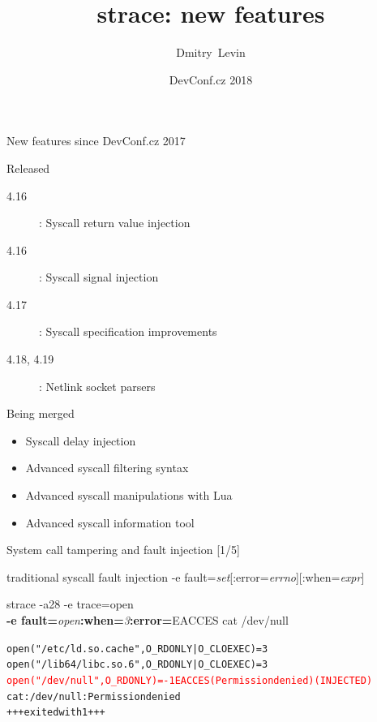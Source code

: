 \documentclass[unicode]{beamer}
\title{\Huge strace: new features}
\author{\Huge Dmitry~Levin}
\institute[BaseALT]{\Large BaseALT}
\date{DevConf.cz 2018}
\begin{document}
\begin{frame}
\titlepage
\end{frame}

\begin{frame}{New features since DevConf.cz 2017}
\begin{block}{\large Released}
\begin{description}
	\item[4.16]: Syscall return value injection
	\item[4.16]: Syscall signal injection
	\item[4.17]: Syscall specification improvements
	\item[4.18, 4.19]: Netlink socket parsers
\end{description}
\end{block}
\begin{block}{\large Being merged}
\begin{itemize}
	\item Syscall delay injection
	\item Advanced syscall filtering syntax
	\item Advanced syscall manipulations with Lua
	\item Advanced syscall information tool
\end{itemize}
\end{block}
\end{frame}

\begin{frame}[fragile]{System call tampering and fault injection \hfill [1/5]}
\begin{block}{\large traditional syscall fault injection}
-e fault=\textit{set}[:error=\textit{errno}][:when=\textit{expr}]
\end{block}
\begin{block}{\large strace -a28 -e trace=open \\ {\bf -e fault=}{\it open}{\bf :when=}{\it 3}{\bf :error=}{\sc EACCES} cat /dev/null}
\begin{alltt}
open("/etc/ld.so.cache", O_RDONLY|O_CLOEXEC) = 3
open("/lib64/libc.so.6", O_RDONLY|O_CLOEXEC) = 3
\textcolor{red}{open("/dev/null", O_RDONLY) = -1 EACCES (Permission denied) (INJECTED)}
cat: /dev/null: Permission denied
+++ exited with 1 +++
\end{alltt}
\end{block}
\end{frame}
\end{document}
